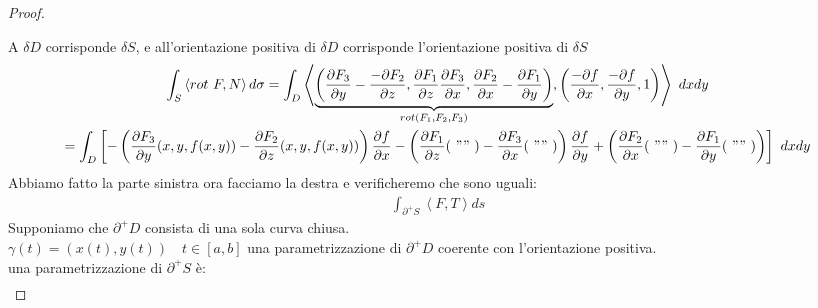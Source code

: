 \documentclass[a4paper, oneside]{article}
\begin{document}
\begin{proof}
\begin{center}
   \end{center}
   A $\delta D$ corrisponde $\delta S$, e all'orientazione positiva di $\delta D$ corrisponde l'orientazione positiva di $\delta S$\\
   \begin{gather*}
    \int_S \left\langle rot \ F , N \right\rangle d\sigma = \int_D \left\langle \underbrace{\left( \frac{\partial F_3}{\partial y} - \frac{-\partial F_2}{\partial z} , \frac{\partial F_1}{\partial z} \frac{\partial F_3}{\partial x} , \frac{\partial F_2}{\partial x} - \frac{\partial F_1}{\partial y} \right)}_{rot(F_1, F_2, F_3)} , \left( \frac{-\partial f}{\partial x}, \frac{-\partial f}{\partial y} , 1 \right) \right\rangle  \ dxdy\\
    = \int_D \left[ -\left(\frac{\partial F_3}{\partial y}(x,y,f(x,y)) - \frac{\partial F_2}{\partial z}(x,y,f(x,y)) \right) \frac{\partial f}{\partial x}  - \left(\frac{\partial F_1}{\partial z}( \ "" \ )- \frac{\partial F_3}{\partial x} ( \ "" \ )\right)\frac{\partial f}{\partial y} + \left(\frac{\partial F_2}{\partial x}( \ "" \ )-\frac{\partial F_1}{\partial y}( \ "" \ )\right)  \right] \ dxdy 
   \end{gather*}
   Abbiamo fatto la parte sinistra ora facciamo la destra e verificheremo che sono uguali:
   \begin{gather*}
    \int_{\partial^+ S} \left\langle F, T \right\rangle ds
   \end{gather*}
   Supponiamo che $\partial^+ D$ consista di una sola curva chiusa.\\
    $\gamma(t) = (x(t), y(t)) \quad t \in [a,b]$ una parametrizzazione di $\partial^+ D$  coerente con l'orientazione positiva.\\
    una parametrizzazione di $\partial^+ S$ è:
   \begin{gather*}

\end{gather*}
\end{proof}
\end{document}
